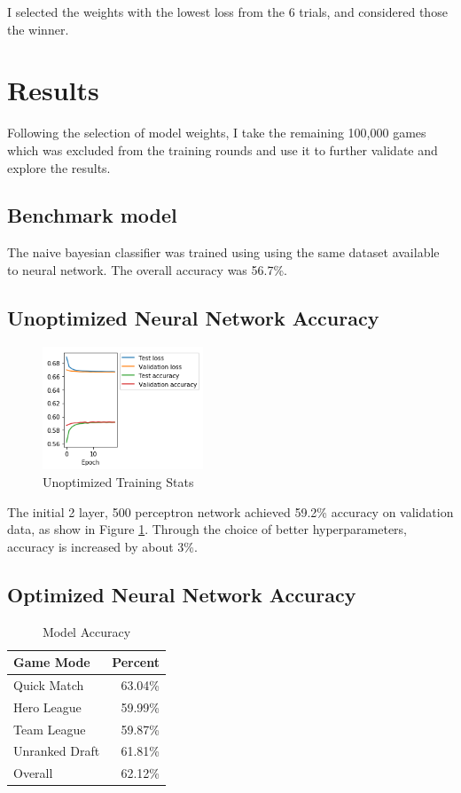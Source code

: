 \documentclass[twoside,twocolumn]{article}
\begin{document}
I selected the weights with the lowest loss from the 6 trials, and considered those the winner.

\section {Results}

Following the selection of model weights, I take the remaining 100,000 games which was excluded from the training rounds and use it to further validate and explore the results.  

\subsection {Benchmark model}

The naive bayesian classifier was trained using  using the same dataset available to neural network.  The overall accuracy was 56.7\%.

\subsection {Unoptimized Neural Network Accuracy}

\begin{figure}
\caption{Unoptimized Training Stats}
\label{figure:500training}
\includegraphics[width=136pt]{500training}
\end{figure}

The initial 2 layer, 500 perceptron network achieved 59.2\% accuracy on validation data, as show in Figure \ref{figure:500training}.  Through the choice of better hyperparameters, accuracy is increased by about 3\%.

\subsection {Optimized Neural Network Accuracy}

\begin{table}[h]
\caption{Model Accuracy}
\label{table:acc}
\centering
\begin{tabular}{lr}
\toprule
Game Mode & Percent \\
\midrule
Quick Match & 63.04\% \\
Hero League & 59.99\% \\
Team League & 59.87\% \\
Unranked Draft & 61.81\% \\
\midrule
Overall & 62.12\% \\
\bottomrule
\end{tabular}
\end{table}
\end{document}
